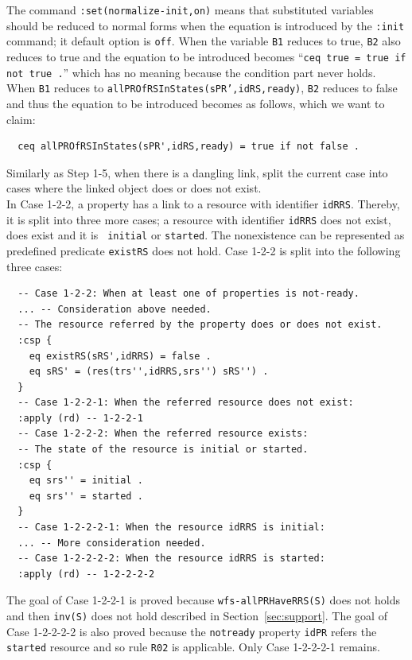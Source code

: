 \documentclass[12pt]{report}
\newcommand{\stt}[1]{{\small{\tt {#1}}}}
\begin{document}
The command \stt{:set(normalize-init,on)} means that substituted
variables should be reduced to normal forms when the equation is
introduced by the {\tt :init} command; it default option is {\tt off}.
When the variable {\tt B1} reduces to true, {\tt B2} also reduces to
true and the equation to be introduced becomes ``\stt{ceq true = true if
  not true .}''  which has no meaning because the condition part never
holds.  When {\tt B1} reduces to
\stt{allPROfRSInStates(sPR',idRS,ready)}, {\tt B2} reduces to false
and thus the equation to be introduced becomes as follows, which we
want to claim:
\small
\begin{verbatim}
  ceq allPROfRSInStates(sPR',idRS,ready) = true if not false .
\end{verbatim}
\normalsize

 Similarly as Step 1-5, when there is a
dangling link, split the current case into cases where the linked
object does or does not exist. \\
In Case 1-2-2, a property has a link to a resource with identifier
{\tt idRRS}. Thereby, it is split into three more cases; a resource
with identifier {\tt idRRS} does not exist, does exist and it is {\tt
  initial} or {\tt started}. The nonexistence can be represented as
predefined predicate {\tt existRS} does not hold. Case 1-2-2 is split
into the following three cases:
\small
\begin{verbatim}
  -- Case 1-2-2: When at least one of properties is not-ready.
  ... -- Consideration above needed.
  -- The resource referred by the property does or does not exist.
  :csp {
    eq existRS(sRS',idRRS) = false .
    eq sRS' = (res(trs'',idRRS,srs'') sRS'') .
  }
  -- Case 1-2-2-1: When the referred resource does not exist:
  :apply (rd) -- 1-2-2-1
  -- Case 1-2-2-2: When the referred resource exists:
  -- The state of the resource is initial or started.
  :csp { 
    eq srs'' = initial .
    eq srs'' = started .
  }
  -- Case 1-2-2-2-1: When the resource idRRS is initial:
  ... -- More consideration needed.
  -- Case 1-2-2-2-2: When the resource idRRS is started:
  :apply (rd) -- 1-2-2-2-2
\end{verbatim}
\normalsize
The goal of Case 1-2-2-1 is proved because \stt{wfs-allPRHaveRRS(S)}
does not holds and then \stt{inv(S)} does not hold described in
Section~\ref{sec:support}.  The goal of Case 1-2-2-2-2 is also proved
because the {\tt notready} property {\tt idPR} refers the {\tt
  started} resource and so rule {\tt R02} is applicable.  Only Case
1-2-2-2-1 remains.\\
\end{document}
